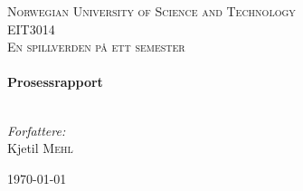 
\begin{titlepage}

\begin{center}
 

\textsc{\LARGE Norwegian University of Science and Technology}\\[1.5cm]

 
\textsc{\Large EIT3014}\\[0.5cm]

\textsc{\large En spillverden på ett semester}\\[0.5cm]
 
 
\HRule \\[0.4cm]
{ \huge \bfseries Prosessrapport}\\[0.4cm]
 
\HRule \\[1.5cm]
 

\begin{center} \Large
\emph{Forfattere:}\\
Kjetil \textsc{Mehl}\\[3cm]
\end{center}
 

{\large \today}\\[4cm] %
 
\vfill
\end{center}

\end{titlepage}
